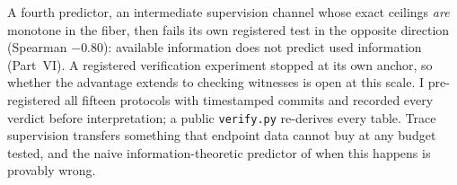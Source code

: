\documentclass[11pt,letterpaper]{article}
\begin{document}
A fourth predictor, an intermediate supervision channel whose exact ceilings \emph{are} monotone in the fiber, then fails its own registered test in the opposite direction (Spearman $-0.80$): available information does not predict used information (Part~VI).
A registered verification experiment stopped at its own anchor, so whether the advantage extends to checking witnesses is open at this scale.
I pre-registered all fifteen protocols with timestamped commits and recorded every verdict before interpretation; a public \texttt{verify.py} re-derives every table.
Trace supervision transfers something that endpoint data cannot buy at any budget tested, and the naive information-theoretic predictor of when this happens is provably wrong.
\clearpage

\setcounter{page}{1}










{\singlespacing

}
\end{document}

